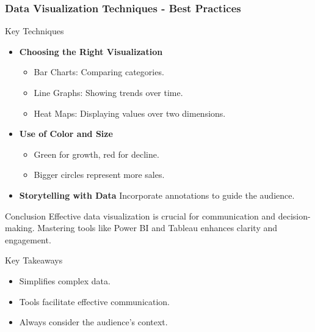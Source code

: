 \documentclass[aspectratio=169]{beamer}
\begin{document}
\begin{frame}[fragile]
    \frametitle{Data Visualization Techniques - Best Practices}
    \begin{block}{Key Techniques}
        \begin{itemize}
            \item \textbf{Choosing the Right Visualization}
                \begin{itemize}
                    \item Bar Charts: Comparing categories.
                    \item Line Graphs: Showing trends over time.
                    \item Heat Maps: Displaying values over two dimensions.
                \end{itemize}
            \item \textbf{Use of Color and Size}
                \begin{itemize}
                    \item Green for growth, red for decline.
                    \item Bigger circles represent more sales.
                \end{itemize}
            \item \textbf{Storytelling with Data}
                Incorporate annotations to guide the audience.
        \end{itemize}
    \end{block}

    \begin{block}{Conclusion}
        Effective data visualization is crucial for communication and decision-making.
        Mastering tools like Power BI and Tableau enhances clarity and engagement.
    \end{block}

    \begin{block}{Key Takeaways}
        \begin{itemize}
            \item Simplifies complex data.
            \item Tools facilitate effective communication.
            \item Always consider the audience's context.
        \end{itemize}
    \end{block}
\end{frame}
\end{document}
